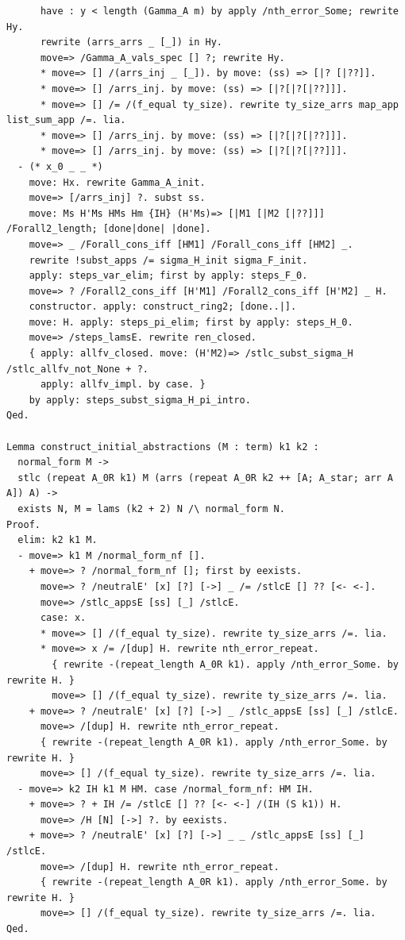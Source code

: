 \begin{lstlisting}
      have : y < length (Gamma_A m) by apply /nth_error_Some; rewrite Hy.
      rewrite (arrs_arrs _ [_]) in Hy.
      move=> /Gamma_A_vals_spec [] ?; rewrite Hy.
      * move=> [] /(arrs_inj _ [_]). by move: (ss) => [|? [|??]].
      * move=> [] /arrs_inj. by move: (ss) => [|?[|?[|??]]].
      * move=> [] /= /(f_equal ty_size). rewrite ty_size_arrs map_app list_sum_app /=. lia.
      * move=> [] /arrs_inj. by move: (ss) => [|?[|?[|??]]].
      * move=> [] /arrs_inj. by move: (ss) => [|?[|?[|??]]].
  - (* x_0 _ _ *)
    move: Hx. rewrite Gamma_A_init.
    move=> [/arrs_inj] ?. subst ss.
    move: Ms H'Ms HMs Hm {IH} (H'Ms)=> [|M1 [|M2 [|??]]] /Forall2_length; [done|done| |done].
    move=> _ /Forall_cons_iff [HM1] /Forall_cons_iff [HM2] _.
    rewrite !subst_apps /= sigma_H_init sigma_F_init.
    apply: steps_var_elim; first by apply: steps_F_0.
    move=> ? /Forall2_cons_iff [H'M1] /Forall2_cons_iff [H'M2] _ H.
    constructor. apply: construct_ring2; [done..|].
    move: H. apply: steps_pi_elim; first by apply: steps_H_0.
    move=> /steps_lamsE. rewrite ren_closed.
    { apply: allfv_closed. move: (H'M2)=> /stlc_subst_sigma_H /stlc_allfv_not_None + ?.
      apply: allfv_impl. by case. }
    by apply: steps_subst_sigma_H_pi_intro.
Qed.

Lemma construct_initial_abstractions (M : term) k1 k2 :
  normal_form M ->
  stlc (repeat A_0R k1) M (arrs (repeat A_0R k2 ++ [A; A_star; arr A A]) A) ->
  exists N, M = lams (k2 + 2) N /\ normal_form N.
Proof.
  elim: k2 k1 M.
  - move=> k1 M /normal_form_nf [].
    + move=> ? /normal_form_nf []; first by eexists.
      move=> ? /neutralE' [x] [?] [->] _ /= /stlcE [] ?? [<- <-].
      move=> /stlc_appsE [ss] [_] /stlcE.
      case: x.
      * move=> [] /(f_equal ty_size). rewrite ty_size_arrs /=. lia.
      * move=> x /= /[dup] H. rewrite nth_error_repeat.
        { rewrite -(repeat_length A_0R k1). apply /nth_error_Some. by rewrite H. }
        move=> [] /(f_equal ty_size). rewrite ty_size_arrs /=. lia.
    + move=> ? /neutralE' [x] [?] [->] _ /stlc_appsE [ss] [_] /stlcE.
      move=> /[dup] H. rewrite nth_error_repeat.
      { rewrite -(repeat_length A_0R k1). apply /nth_error_Some. by rewrite H. }
      move=> [] /(f_equal ty_size). rewrite ty_size_arrs /=. lia.
  - move=> k2 IH k1 M HM. case /normal_form_nf: HM IH.
    + move=> ? + IH /= /stlcE [] ?? [<- <-] /(IH (S k1)) H.
      move=> /H [N] [->] ?. by eexists.
    + move=> ? /neutralE' [x] [?] [->] _ _ /stlc_appsE [ss] [_] /stlcE.
      move=> /[dup] H. rewrite nth_error_repeat.
      { rewrite -(repeat_length A_0R k1). apply /nth_error_Some. by rewrite H. }
      move=> [] /(f_equal ty_size). rewrite ty_size_arrs /=. lia.
Qed.


\end{lstlisting}
